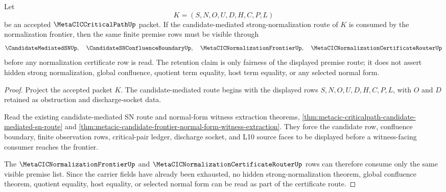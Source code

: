 \begin{theorem}
\label{thm:metacic-candidate-mediated-sn-frontier-fairness-retention}
Let
$$
K=(S,N,O,U,D,H,C,P,L)
$$
be an accepted $\MetaCICCriticalPathUp$ packet. If the candidate-mediated strong-normalization route of $K$ is consumed by the normalization frontier, then the same finite premise rows must be visible through
$$
\CandidateMediatedSNUp,\quad \CandidateSNConfluenceBoundaryUp,\quad \MetaCICNormalizationFrontierUp,\quad \MetaCICNormalizationCertificateRouterUp
$$
before any normalization certificate row is read. The retention claim is only fairness of the displayed premise route; it does not assert hidden strong normalization, global confluence, quotient term equality, host term equality, or any selected normal form.
\end{theorem}
\begin{proof}
Project the accepted packet $K$. The candidate-mediated route begins with the displayed rows $S,N,O,U,D,H,C,P,L$, with $O$ and $D$ retained as obstruction and discharge-socket data.

Read the existing candidate-mediated SN route and normal-form witness extraction theorems, \autoref{thm:metacic-criticalpath-candidate-mediated-sn-route} and \autoref{thm:metacic-candidate-frontier-normal-form-witness-extraction}. They force the candidate row, confluence boundary, finite observation rows, critical-pair ledger, discharge socket, and L10 source faces to be displayed before a witness-facing consumer reaches the frontier.

The $\MetaCICNormalizationFrontierUp$ and $\MetaCICNormalizationCertificateRouterUp$ rows can therefore consume only the same visible premise list. Since the carrier fields have already been exhausted, no hidden strong-normalization theorem, global confluence theorem, quotient equality, host equality, or selected normal form can be read as part of the certificate route.
\end{proof}

